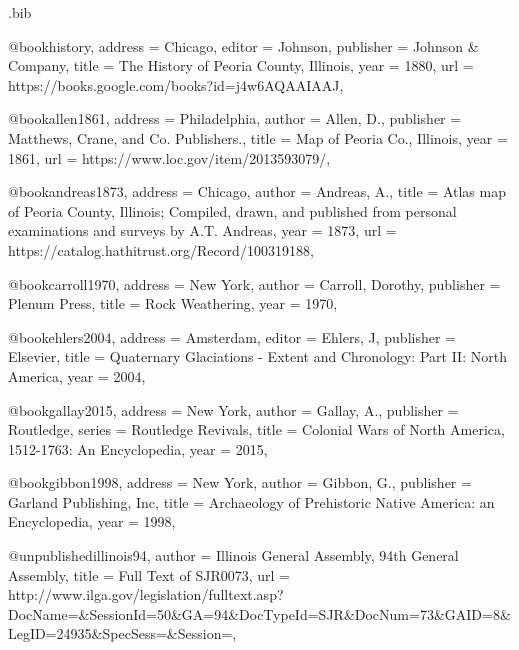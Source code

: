 \def\affilone{Cultural Field Technician, Cardno JFNew}

\def\affiloneauthor{*}%
\def\affiltwoauthor{†}%

\begin{filecontents}{\IJSRAidentifier.bib}

	@book{history,
		address = {Chicago},
		editor = {Johnson},
		publisher = {Johnson \& Company},
		title = {The History of Peoria County, Illinois},
		year = {1880},
		url = {https://books.google.com/books?id=j4w6AQAAIAAJ},
	}

	@book{allen1861,
		address = {Philadelphia},
		author = {Allen, D.},
		publisher = {Matthews, Crane, and Co. Publishers.},
		title = {Map of Peoria Co., Illinois},
		year = {1861},
		url = {https://www.loc.gov/item/2013593079/},
	}

	@book{andreas1873,
		address = {Chicago},
		author = {Andreas, A.},
		title = {Atlas map of Peoria County, Illinois; Compiled, drawn, and published from personal examinations and surveys by A.T. Andreas},
		year = {1873},
		url = {https://catalog.hathitrust.org/Record/100319188},
	}



	@book{carroll1970,
		address = {New York},
		author = {Carroll, Dorothy},
		publisher = {Plenum Press},
		title = {Rock Weathering},
		year = {1970},
	}

	@book{ehlers2004,
		address = {Amsterdam},
		editor = {Ehlers, J},
		publisher = {Elsevier},
		title = {Quaternary Glaciations - Extent and Chronology: Part II: North America},
		year = {2004},
	}

	@book{gallay2015,
		address = {New York},
		author = {Gallay, A.},
		publisher = {Routledge},
		series = {Routledge Revivals},
		title = {Colonial Wars of North America, 1512-1763: An Encyclopedia},
		year = {2015},
	}

	@book{gibbon1998,
		address = {New York},
		author = {Gibbon, G.},
		publisher = {Garland Publishing, Inc},
		title = {Archaeology of Prehistoric Native America: an Encyclopedia},
		year = {1998},
	}



	@unpublished{illinois94,
		author = {Illinois General Assembly, 94th General Assembly},
		title = {Full Text of SJR0073},
		url = {http://www.ilga.gov/legislation/fulltext.asp?DocName=\&SessionId=50\&GA=94\&DocTypeId=SJR\&DocNum=73\&GAID=8\&LegID=24935\&SpecSess=\&Session=},
	}



\end{filecontents}
